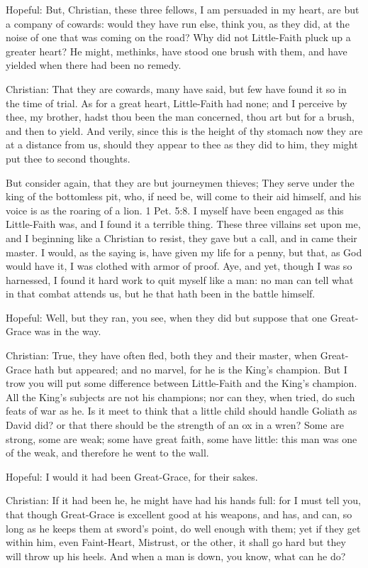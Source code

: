 Hopeful: But, Christian, these three fellows, I am persuaded in my heart, are but a company of cowards: would they have run else, think you, as they did, at the noise of one that was coming on the road? Why did not Little-Faith pluck up a greater heart? He might, methinks, have stood one brush with them, and have yielded when there had been no remedy.

Christian: That they are cowards, many have said, but few have found it so in the time of trial. As for a great heart, Little-Faith had none; and I perceive by thee, my brother, hadst thou been the man concerned, thou art but for a brush, and then to yield. And verily, since this is the height of thy stomach now they are at a distance from us, should they appear to thee as they did to him, they might put thee to second thoughts.

But consider again, that they are but journeymen thieves; They serve under the king of the bottomless pit, who, if need be, will come to their aid himself, and his voice is as the roaring of a lion. 1 Pet. 5:8. I myself have been engaged as this Little-Faith was, and I found it a terrible thing. These three villains set upon me, and I beginning like a Christian to resist, they gave but a call, and in came their master. I would, as the saying is, have given my life for a penny, but that, as God would have it, I was clothed with armor of proof. Aye, and yet, though I was so harnessed, I found it hard work to quit myself like a man: no man can tell what in that combat attends us, but he that hath been in the battle himself.

Hopeful: Well, but they ran, you see, when they did but suppose that one Great-Grace was in the way.

Christian: True, they have often fled, both they and their master, when Great-Grace hath but appeared; and no marvel, for he is the King's champion. But I trow you will put some difference between Little-Faith and the King's champion. All the King's subjects are not his champions; nor can they, when tried, do such feats of war as he. Is it meet to think that a little child should handle Goliath as David did? or that there should be the strength of an ox in a wren? Some are strong, some are weak; some have great faith, some have little: this man was one of the weak, and therefore he went to the wall.

Hopeful: I would it had been Great-Grace, for their sakes.

Christian: If it had been he, he might have had his hands full: for I must tell you, that though Great-Grace is excellent good at his weapons, and has, and can, so long as he keeps them at sword's point, do well enough with them; yet if they get within him, even Faint-Heart, Mistrust, or the other, it shall go hard but they will throw up his heels. And when a man is down, you know, what can he do?

